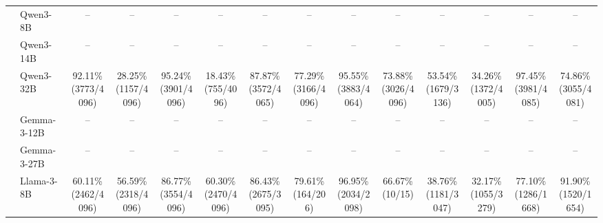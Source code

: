 \begin{table}[t]
{\begin{tabular}{ll*{12}{c}}
 & Qwen3-8B & -- & -- & -- & -- & -- & -- & -- & -- & -- & -- & -- & -- \\
 & Qwen3-14B & -- & -- & -- & -- & -- & -- & -- & -- & -- & -- & -- & -- \\
 & Qwen3-32B & \makecell[c]{92.11\%\\[-1pt]\scriptsize(3773/4096)} & \makecell[c]{28.25\%\\[-1pt]\scriptsize(1157/4096)} & \makecell[c]{95.24\%\\[-1pt]\scriptsize(3901/4096)} & \makecell[c]{18.43\%\\[-1pt]\scriptsize(755/4096)} & \makecell[c]{87.87\%\\[-1pt]\scriptsize(3572/4065)} & \makecell[c]{77.29\%\\[-1pt]\scriptsize(3166/4096)} & \makecell[c]{95.55\%\\[-1pt]\scriptsize(3883/4064)} & \makecell[c]{73.88\%\\[-1pt]\scriptsize(3026/4096)} & \makecell[c]{53.54\%\\[-1pt]\scriptsize(1679/3136)} & \makecell[c]{34.26\%\\[-1pt]\scriptsize(1372/4005)} & \makecell[c]{97.45\%\\[-1pt]\scriptsize(3981/4085)} & \makecell[c]{74.86\%\\[-1pt]\scriptsize(3055/4081)} \\
 & Gemma-3-12B & -- & -- & -- & -- & -- & -- & -- & -- & -- & -- & -- & -- \\
 & Gemma-3-27B & -- & -- & -- & -- & -- & -- & -- & -- & -- & -- & -- & -- \\
 & Llama-3-8B & \makecell[c]{60.11\%\\[-1pt]\scriptsize(2462/4096)} & \makecell[c]{56.59\%\\[-1pt]\scriptsize(2318/4096)} & \makecell[c]{86.77\%\\[-1pt]\scriptsize(3554/4096)} & \makecell[c]{60.30\%\\[-1pt]\scriptsize(2470/4096)} & \makecell[c]{86.43\%\\[-1pt]\scriptsize(2675/3095)} & \makecell[c]{79.61\%\\[-1pt]\scriptsize(164/206)} & \makecell[c]{96.95\%\\[-1pt]\scriptsize(2034/2098)} & \makecell[c]{66.67\%\\[-1pt]\scriptsize(10/15)} & \makecell[c]{38.76\%\\[-1pt]\scriptsize(1181/3047)} & \makecell[c]{32.17\%\\[-1pt]\scriptsize(1055/3279)} & \makecell[c]{77.10\%\\[-1pt]\scriptsize(1286/1668)} & \makecell[c]{91.90\%\\[-1pt]\scriptsize(1520/1654)} \\

\end{tabular}}
\end{table}
